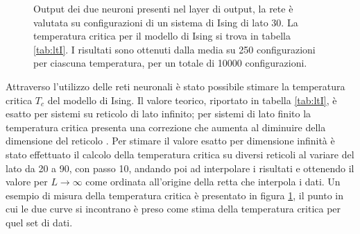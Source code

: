 \documentclass{article}
\begin{document}
\begin{figure}[ht]
\centering
{}
  \caption{Output dei due neuroni presenti nel layer di output, la rete è valutata su configurazioni di un sistema di Ising di lato 30. La temperatura critica per il modello di Ising si trova in tabella \ref{tab:ltI}. I risultati sono ottenuti dalla media su 250 configurazioni per ciascuna temperatura, per un totale di \num{10000} configurazioni.}
\label{fig:temp_cross}
\end{figure}

Attraverso l'utilizzo delle reti neuronali è stato possibile stimare la temperatura critica $T_c$ del modello di Ising.
Il valore teorico, riportato in tabella \ref{tab:ltI}, è esatto per sistemi su reticolo di lato infinito; per sistemi di lato finito la temperatura critica presenta una correzione che aumenta al diminuire della dimensione del reticolo \cite{fisher}.
Per stimare il valore esatto per dimensione infinità è stato effettuato il calcolo della temperatura critica su diversi reticoli al variare del lato da 20 a 90, con passo 10, andando poi ad interpolare i risultati e ottenendo il valore per $L\rightarrow \infty$ come ordinata all'origine della retta che interpola i dati.
Un esempio di misura della temperatura critica è presentato in figura \ref{fig:temp_cross}, il punto in cui le due curve si incontrano è preso come stima della temperatura critica per quel set di dati.
\end{document}

